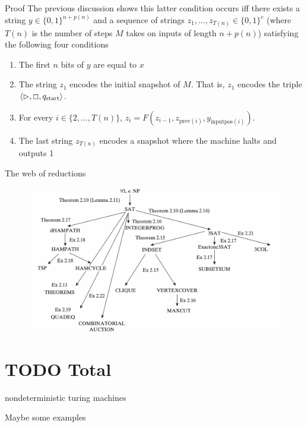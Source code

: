 \documentclass[presentation]{beamer}
\def \start {\text{start}}
\begin{document}
\begin{frame}[label={sec:org35515a5}]{Proof}
The previous discussion shows this latter condition occurs iff
 there exists a string \(y\in\{0,1\}^{n+p(n)}\) and a sequence of strings
 \(z_1,\dots,z_{T(n)}\in\{0,1\}^c\) (where \(T(n)\) is the number of steps \(M\) takes on inputs
 of length \(n+p(n)\)) satisfying the following four conditions
\begin{enumerate}
\item The first \(n\) bits of \(y\) are equal to \(x\)
\item The string \(z_1\) encodes the initial snapshot of \(M\). That is, \(z_1\) encodes the
triple \(\la\rhd,\Box,q_{\start}\ra\).
\item For every \(i\in\{2,\dots,T(n)\}\), \(z_i=F(z_{i-1},z_{\text{prev}(i)},y_{\text{inputpos}(i)})\).
\item The last string \(z_{T(n)}\) encodes a snapshot where the machine halts and outputs 1
\end{enumerate}
\end{frame}

\begin{frame}[label={sec:org928477b}]{The web of reductions}
\begin{figure}[htbp]
\centering
\includegraphics[width=.8\textwidth]{./3.pdf}
\label{}
\end{figure}
\end{frame}

\section{{\bfseries\sffamily TODO} Total}
\label{sec:orge0a657f}

nondeterministic turing machines

Maybe some examples
\end{document}
